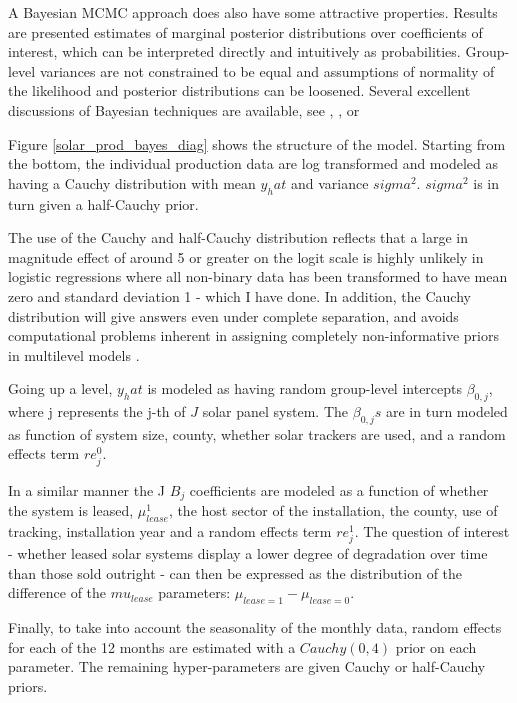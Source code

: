 \documentclass[12pt]{article}
\begin{document}
A Bayesian MCMC approach does also have some attractive properties. Results are presented estimates of marginal posterior distributions over coefficients of interest, which can be interpreted directly and intuitively as probabilities. Group-level variances are not constrained to be equal and assumptions of normality of the likelihood and posterior distributions can be loosened. Several excellent discussions of Bayesian techniques are available, see \citet{gelman_bayesian_2013}, \citet{kruschke_doing_2014}, or \citet{mc}

Figure \ref{solar_prod_bayes_diag} shows the structure of the model. Starting from the bottom, the individual production data are log transformed and modeled as having a Cauchy distribution with mean $y_hat$ and variance $sigma^2$. $sigma^2$ is in turn given a half-Cauchy prior.

The use of the Cauchy and half-Cauchy distribution reflects that a large in magnitude effect of around 5 or greater on the logit scale is highly unlikely in logistic regressions where all non-binary data has been transformed to have mean zero and standard deviation 1 - which I have done. In addition, the Cauchy distribution will give answers even under complete separation, and avoids computational problems inherent in assigning completely non-informative priors in multilevel models \citep{gelman_weakly_2008}.

Going up a level, $y_hat$ is modeled as having random group-level intercepts $\beta_{0,j}$, where j represents the j-th of $J$ solar panel system. The $\beta_{0,j}s$ are in turn modeled as function of system size, county, whether solar trackers are used, and a random effects term $re_j^0$.

In a similar manner the J $B_j$ coefficients are modeled as a function of whether the system is leased, $\mu_{lease}^1$, the host sector of the installation, the county, use of tracking, installation year and a random effects term $re^1_j$.  The question of interest - whether leased solar systems display a lower degree of degradation over time than those sold outright - can then be expressed as the distribution of the difference of the $mu_{lease}$ parameters: $\mu_{lease=1} - \mu_{lease=0}$.

Finally, to take into account the seasonality of the monthly data, random effects for each of the 12 months are estimated with a $Cauchy(0,4)$ prior on each parameter. The remaining hyper-parameters are given Cauchy or half-Cauchy priors.
\end{document}
